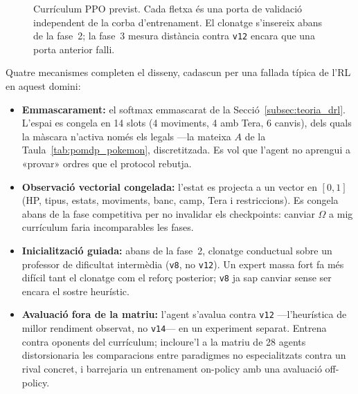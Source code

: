 \begin{figure}[htbp]
    \centering
    \caption{Currículum PPO previst. Cada fletxa és una porta de validació independent de la corba d'entrenament. El clonatge s'insereix abans de la fase~2; la fase~3 mesura distància contra \texttt{v12} encara que una porta anterior falli.}
    \label{fig:ppo_curriculum_design}
\end{figure}

Quatre mecanismes completen el disseny, cadascun per una fallada típica de l'RL en aquest domini:

\begin{itemize}
    \item \textbf{Emmascarament:} el softmax emmascarat de la Secció~\ref{subsec:teoria_drl}. L'espai es congela en 14 slots (4 moviments, 4 amb Tera, 6 canvis), dels quals la màscara n'activa només els legals ---la mateixa $A$ de la Taula~\ref{tab:pomdp_pokemon}, discretitzada. Es vol que l'agent no aprengui a «provar» ordres que el protocol rebutja.
    \item \textbf{Observació vectorial congelada:} l'estat es projecta a un vector en $[0,1]$ (HP, tipus, estats, moviments, banc, camp, Tera i restriccions). Es congela abans de la fase competitiva per no invalidar els checkpoints: canviar $\Omega$ a mig currículum faria incomparables les fases.
    \item \textbf{Inicialització guiada:} abans de la fase~2, clonatge conductual sobre un professor de dificultat intermèdia (\texttt{v8}, no \texttt{v12}). Un expert massa fort fa més difícil tant el clonatge com el reforç posterior; \texttt{v8} ja sap canviar sense ser encara el sostre heurístic.
    \item \textbf{Avaluació fora de la matriu:} l'agent s'avalua contra \texttt{v12} ---l'heurística de millor rendiment observat, no \texttt{v14}--- en un experiment separat. Entrena contra oponents del currículum; incloure'l a la matriu de 28 agents distorsionaria les comparacions entre paradigmes no especialitzats contra un rival concret, i barrejaria un entrenament on-policy amb una avaluació off-policy.
\end{itemize}

